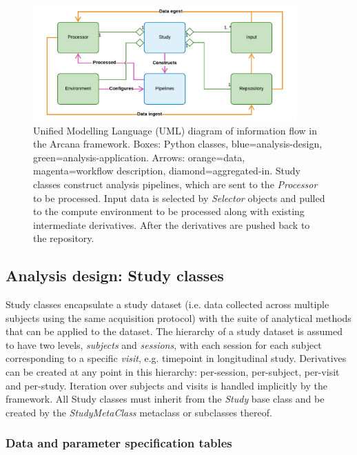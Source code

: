\documentclass[smallextended]{svjour3}       %
\begin{document}
\begin{figure}
    \centering
    \includegraphics[width=0.9\textwidth]{../figures/simplified_arcana_uml}
  \caption{Unified Modelling Language (UML) diagram
of information flow in the Arcana framework. Boxes: Python classes,
blue=analysis-design, green=analysis-application. Arrows: orange=data,
magenta=workflow description, diamond=aggregated-in. Study classes
construct analysis pipelines, which are sent to the \emph{Processor} to
be processed. Input data is selected by \emph{Selector} objects and
pulled to the compute environment to be processed along with existing
intermediate derivatives. After the derivatives are pushed back to the
repository.}
\label{fig:simple_uml}
\end{figure}

\subsection*{Analysis design: Study classes}
\label{analysis-design-study-classes}

Study classes encapsulate a study dataset (i.e. data collected across
multiple subjects using the same acquisition protocol) with the suite of
analytical methods that can be applied to the dataset. The hierarchy of
a study dataset is assumed to have two levels, \emph{subjects} and
\emph{sessions}, with each session for each subject corresponding to a
specific \emph{visit}, e.g. timepoint in longitudinal study. Derivatives
can be created at any point in this hierarchy: per-session, per-subject,
per-visit and per-study. Iteration over subjects and visits is handled
implicitly by the framework. All Study classes must inherit from the
\emph{Study} base class and be created by the \emph{StudyMetaClass}
metaclass or subclasses thereof.

\subsubsection*{Data and parameter specification
tables}
\label{sec:data-and-parameter-specification-tables}
\end{document}
